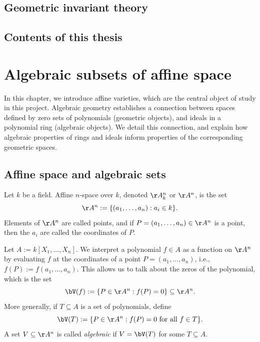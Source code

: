 \documentclass[12pt]{amsart}
\theoremstyle{plain}
\begin{document}
\subsection{Geometric invariant theory}





\subsection{Contents of this thesis}










\newpage
{}
\section{Algebraic subsets of affine space}\label{chapter:algebraicsubsets}
In this chapter, we introduce affine varieties, which are the central object of study in this project.
Algebraic geometry establishes a connection between spaces defined by zero sets of polynomials (geometric objects), and ideals in a polynomial ring (algebraic objects).
We detail this connection, and explain how algebraic properties of rings and ideals inform properties of the corresponding geometric spaces.





\subsection{Affine space and algebraic sets}
Let $k$ be a field.
Affine $n$-space over $k$, denoted $\AA^n_k$ or $\AA^n$, is the set 
$$\AA^n := \{(a_1, \ldots, a_n) : a_i \in k\}.$$
Elements of $\AA^n$ are called points, and if $P = (a_1, \ldots, a_n) \in \AA^n$ is a point, then the $a_i$ are called the coordinates of $P$.

Let $A := k[X_1, \ldots, X_n]$.
We interpret a polynomial $f \in A$ as a function on $\AA^n$ by evaluating $f$ at the coordinates of a point $P = (a_1, \ldots, a_n)$, i.e., $f(P) := f(a_1, \ldots, a_n).$
This allows us to talk about the zeros of the polynomial, which is the set
$$\bV(f) := \{P \in \AA^n : f(P) = 0\} \subseteq \AA^n.$$
More generally, if $T \subseteq A$ is a set of polynomials, define
$$\bV(T) := \{P \in \AA^n : f(P) = 0 \text{ for all } f \in T\}.$$
A set $V \subseteq \AA^n$ is called \emph{algebraic} if $V = \bV(T)$ for some $T \subseteq A$.
\end{document}
